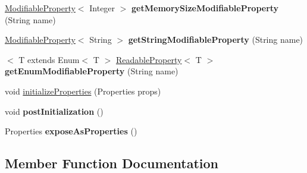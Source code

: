 \begin{DoxyCompactItemize}
\item 
\mbox{\label{interfacecom_1_1mysql_1_1cj_1_1conf_1_1_property_set_a8cc24f5252be30243814c05679700586}} 
\mbox{\hyperlink{interfacecom_1_1mysql_1_1cj_1_1conf_1_1_modifiable_property}{Modifiable\+Property}}$<$ Integer $>$ {\bfseries get\+Memory\+Size\+Modifiable\+Property} (String name)
\item 
\mbox{\label{interfacecom_1_1mysql_1_1cj_1_1conf_1_1_property_set_ac67409f3c62157f17e4dfb2ccd320e84}} 
\mbox{\hyperlink{interfacecom_1_1mysql_1_1cj_1_1conf_1_1_modifiable_property}{Modifiable\+Property}}$<$ String $>$ {\bfseries get\+String\+Modifiable\+Property} (String name)
\item 
\mbox{\label{interfacecom_1_1mysql_1_1cj_1_1conf_1_1_property_set_ac4b27fd4d71b53f1af527c93058fec49}} 
$<$ T extends Enum$<$ T $>$ \mbox{\hyperlink{interfacecom_1_1mysql_1_1cj_1_1conf_1_1_readable_property}{Readable\+Property}}$<$ T $>$ {\bfseries get\+Enum\+Modifiable\+Property} (String name)
\item 
void \mbox{\hyperlink{interfacecom_1_1mysql_1_1cj_1_1conf_1_1_property_set_a4d0959318c1dd50f8d73a4aabcacd2ae}{initialize\+Properties}} (Properties props)
\item 
\mbox{\label{interfacecom_1_1mysql_1_1cj_1_1conf_1_1_property_set_a1e590d8f29a11f3231099aa1c163f987}} 
void {\bfseries post\+Initialization} ()
\item 
\mbox{\label{interfacecom_1_1mysql_1_1cj_1_1conf_1_1_property_set_a1742a6e5438541b51a5794654bf98489}} 
Properties {\bfseries expose\+As\+Properties} ()
\end{DoxyCompactItemize}


\subsection{Member Function Documentation}
\mbox{\label{interfacecom_1_1mysql_1_1cj_1_1conf_1_1_property_set_a4d0959318c1dd50f8d73a4aabcacd2ae}} 
